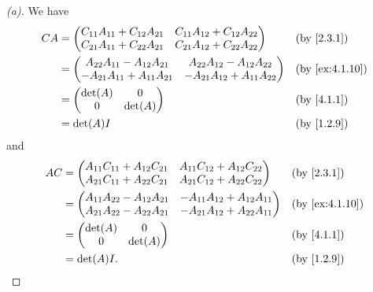 \begin{proof}[(a)]
  We have
  \begin{align*}
    CA & = \begin{pmatrix}
             C_{1 1} A_{1 1} + C_{1 2} A_{2 1} & C_{1 1} A_{1 2} + C_{1 2} A_{2 2} \\
             C_{2 1} A_{1 1} + C_{2 2} A_{2 1} & C_{2 1} A_{1 2} + C_{2 2} A_{2 2}
           \end{pmatrix}   &  & \by{2.3.1}                    \\
       & = \begin{pmatrix}
             A_{2 2} A_{1 1} - A_{1 2} A_{2 1}  & A_{2 2} A_{1 2} - A_{1 2} A_{2 2}  \\
             -A_{2 1} A_{1 1} + A_{1 1} A_{2 1} & -A_{2 1} A_{1 2} + A_{1 1} A_{2 2}
           \end{pmatrix} &  & \by{ex:4.1.10}                  \\
       & = \begin{pmatrix}
             \det(A) & 0       \\
             0       & \det(A)
           \end{pmatrix}                                                       &  & \by{4.1.1}      \\
       & = \det(A) I                                                                &  & \by{1.2.9}
  \end{align*}
  and
  \begin{align*}
    AC & = \begin{pmatrix}
             A_{1 1} C_{1 1} + A_{1 2} C_{2 1} & A_{1 1} C_{1 2} + A_{1 2} C_{2 2} \\
             A_{2 1} C_{1 1} + A_{2 2} C_{2 1} & A_{2 1} C_{1 2} + A_{2 2} C_{2 2}
           \end{pmatrix}  &  & \by{2.3.1}                   \\
       & = \begin{pmatrix}
             A_{1 1} A_{2 2} - A_{1 2} A_{2 1} & -A_{1 1} A_{1 2} + A_{1 2} A_{1 1} \\
             A_{2 1} A_{2 2} - A_{2 2} A_{2 1} & -A_{2 1} A_{1 2} + A_{2 2} A_{1 1}
           \end{pmatrix} &  & \by{ex:4.1.10}                  \\
       & = \begin{pmatrix}
             \det(A) & 0       \\
             0       & \det(A)
           \end{pmatrix}                                                      &  & \by{4.1.1}      \\
       & = \det(A) I.                                                              &  & \by{1.2.9}
  \end{align*}
\end{proof}

